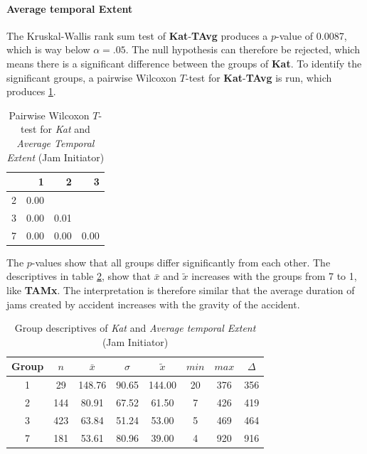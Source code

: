 \paragraph{Average temporal Extent}
The Kruskal-Wallis rank sum test of \textbf{Kat}-\textbf{TAvg} produces a $p$-value of 0.0087, which is way below $\alpha=.05$. The null hypothesis can therefore be rejected, which means there is a significant difference between the groups of \textbf{Kat}. To identify the significant groups, a pairwise Wilcoxon $T$-test for \textbf{Kat}-\textbf{TAvg} is run, which produces \cref{tbl:wilcoxon_baysis_initiator_Kat_TAvg}. 
\begin{table}[ht]
	\small
	\centering
    \begin{tabular}{rrrr}
        \toprule
        & 1 & 2 & 3 \\ 
        \midrule
        2 & 0.00 &  &  \\ 
        3 & 0.00 & 0.01 &  \\ 
        7 & 0.00 & 0.00 & 0.00 \\ 
        \bottomrule
    \end{tabular}
	\caption{Pairwise Wilcoxon $T$-test for \textit{Kat} and \textit{Average Temporal Extent} (Jam Initiator)}
	\label{tbl:wilcoxon_baysis_initiator_Kat_TAvg}
\end{table}
The $p$-values show that all groups differ significantly from each other. The descriptives in table \cref{tbl:descriptives_baysis_initiator_Kat_TAvg}, show that $\bar{x}$ and $\tilde{x}$ increases with the groups from 7 to 1, like \textbf{TAMx}. The interpretation is therefore similar that the average duration of jams created by accident increases with the gravity of the accident.
\begin{table}[ht]
	\small
	\centering
    \begin{tabular}{c|c|c|c|c|c|c|c}
        \toprule
        Group & $n$ & $\bar{x}$ & $\sigma$ & $\tilde{x}$ & $min$ & $max$ & $\Delta$ \\
        \midrule
        1 & 29  & 148.76 & 90.65 & 144.00 & 20 & 376 & 356 \\ 
        2 & 144 & 80.91  & 67.52 & 61.50  & 7  & 426 & 419 \\ 
        3 & 423 & 63.84  & 51.24 & 53.00  & 5  & 469 & 464 \\ 
        7 & 181 & 53.61  & 80.96 & 39.00  & 4  & 920 & 916 \\ 
        \bottomrule
    \end{tabular}
	\caption{Group descriptives of \textit{Kat} and \textit{Average temporal Extent} (Jam Initiator)}
	\label{tbl:descriptives_baysis_initiator_Kat_TAvg}
\end{table}

